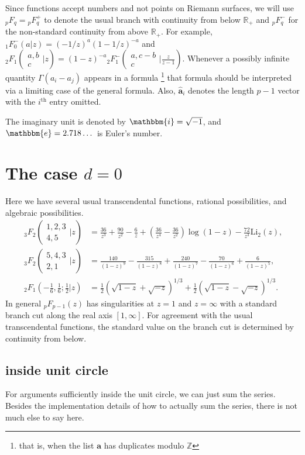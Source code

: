 \documentclass[12pt]{article}
\newcommand{\ee}[0] {\mathbbm{e}}
\newcommand{\ii}[0] {\mathbbm{i}}
\numberwithin{equation}{section}
\newcommand{\Head}[3] {{}_{#1}{#2}_{#3}}
\newcommand{\FF}[6] {{}_{#1}{#2}_{#3} \left( \begin{array}{c} #4 \\ #5 \end{array} \Big| {#6}  \right)}
\newcommand{\FFs}[6] {{}_{#1}{#2}_{#3} ( \begin{smallmatrix} #4 \\ #5 \end{smallmatrix} | {#6}  )}
\newcommand{\FFes}[7] {{}_{#1}^{\,}{#2}_{#3}^{#4} ( \begin{smallmatrix} #5 \\ #6 \end{smallmatrix} | {#7} )}
\newcommand{\FFf}[5] {{}_{#1}{#2}_{#3} \left(#4 | {#5} \right)}
\newcommand{\bfa}[0] {\mathbf{a}}
\begin{document}
Since functions accept numbers and not points on Riemann surfaces, we will use ${}_p F_{q} = {}_p F_{q}^{+}$ to denote the usual branch with continuity from below $\mathbb{R}_{+}$ and ${}_p^{\,} F_{q}^{-}$ for the non-standard continuity from above $\mathbb{R}_{+}$. For example, $\Head{1}{F}{0}^{-}(a|z) = (-1/z)^a (1-1/z)^{-a}$ and $\FFs{2}{F}{1}{a,b}{c}{z} = (1-z)^{-a} \FFes{2}{F}{1}{-}{a,c-b}{c}{\tfrac{z}{z-1}}$. Whenever a possibly infinite quantity $\Gamma(a_i-a_j)$ appears in a formula \footnote{that is, when the list $\bfa$ has duplicates modulo $\mathbb{Z}$} that formula should be interpreted via a limiting case of the general formula. Also, $\hat{\mathbf{a}}_i$ denotes the length $p-1$ vector with the $i^{\text{th}}$ entry omitted.

The imaginary unit is denoted by $\ii = \sqrt{-1}$, and $\ee = 2.718\dots$ is Euler's number.

\section{The case $d=0$}
Here we have several usual transcendental functions, rational possibilities, and algebraic possibilities.
\begin{align*}
\FF{3}{F}{2}{1,2,3}{4,5}{z} &= \frac{36}{z^3}+\frac{90}{z^2}-\frac{6}{z}+\left
   (\frac{36}{z^4}-\frac{36}{z^2}\right) \log
   (1-z)-\frac{72}{z^3}
   \text{Li}_2(z)\text{,}\\
\FF{3}{F}{2}{5,4,3}{2,1}{z} &= \frac{140}{(1-z)^9}-\frac{315}{(1-z)^8}+\frac{240}{(1-z)^7}-\frac{70}{(1-z)^6}+\frac{6}{(1-z)^5}\text{,}\\
\FFf{2}{F}{1}{-\tfrac{1}{6}, \tfrac{1}{6};\tfrac{1}{2}}{z} &= \tfrac{1}{2} \left(\sqrt{1-z}+\sqrt{-z}\right)^{1/3}+\tfrac{1}{2} \left(\sqrt{1-z}-\sqrt{-z}\right)^{1/3}\text{.}
\end{align*}
In general ${}_{p}F_{p-1}(z)$ has singularities at $z=1$ and $z=\infty$ with a standard branch cut along the real axis $[1,\infty]$. For agreement with the usual transcendental functions, the standard value on the branch cut is determined by continuity from below.

\subsection{inside unit circle}
For arguments sufficiently inside the unit circle, we can just sum the series. Besides the implementation details of how to actually sum the series, there is not much else to say here.
\end{document}
